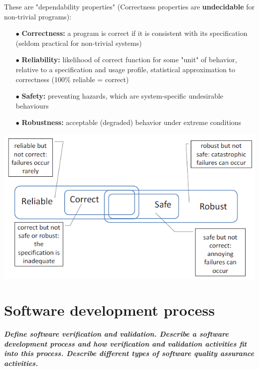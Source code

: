 \documentclass{article}
\begin{document}
\noindent These are "dependability properties" (Correctness
properties
are
\textbf{undecidable} for non-trivial programs): 
\begin{itemize}
    \item [$\bullet$]\textbf{Correctness:} a program is correct if it is consistent with its specification (seldom practical for non-trivial systems)
    \item [$\bullet$]\textbf{Reliability:} likelihood of correct function for some "unit" of behavior, relative to a specification and usage profile, statistical approximation to correctness (100\% reliable = correct)
    \item [$\bullet$]\textbf{Safety:} preventing hazards, which are system-specific undesirable behaviours
    \item [$\bullet$]\textbf{Robustness:} acceptable (degraded) behavior under extreme conditions
\end{itemize}
\begin{center}
    \includegraphics[scale = 0.55]{image/2.png}
\end{center}

\newpage
\section{Software development process}
\textbf{\textit{Define software verification and validation. Describe a software development process and how verification
and validation activities fit into this process. Describe different types of software quality assurance activities.}}
\end{document}
